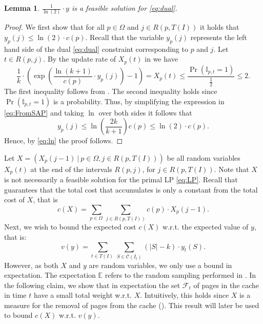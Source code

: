 \documentclass[11pt]{article}
\newcommand{\op}{{\mathbb{I}_{p,t}}}
\newcommand{\cF}{{\mathcal{F}}}
\newcommand{\cC}{{\mathcal{C}}}
\newcommand{\E}{{\mathbb{E}}}
\newcommand{\om}{{\Omega}}
\newcommand{\bbc}{{\bar{\cC}(I_t)}}
\newtheorem{lemma}[thm]{Lemma}
\begin{document}
{	\begin{lemma}
	\label{lem:dualF}
$\frac{1}{\ln(2)} \cdot y$ is a feasible solution for \eqref{eq:dual}. 
\end{lemma}

\begin{proof}
We first show that for all  $p \in \om$ and $j \in R(p,T(I))$ it holds that $y_p(j) \leq \ln (2) \cdot c(p)$. Recall that the variable $y_p(j)$ represents the left hand side of the dual \eqref{eq:dual} constraint corresponding to $p$ and $j$. Let $t \in R(p,j)$. By the update rate of $X_p(t)$ in  we have
	\begin{equation}
		\label{eq:FromSAP}
		  \frac{1}{k} \cdot \left(     \exp \left(  \frac{\ln (k+1)}{c(p)} \cdot y_p(j)\right)-1\right) = X_p(t) \leq  \frac{\Pr \left(   \op = 1 \right)}{\frac{1}{2}} \leq 2. 
	\end{equation} 	The first inequality follows from . The second inequality holds since $\Pr \left(   \op = 1 \right)$ is a probability. Thus, by simplifying the expression in \eqref{eq:FromSAP} and taking $\ln$ over both sides it follows that 
	\begin{equation}
		\label{eq:ln}
		y_p(j) \leq \ln \left( \frac{2k}{k+1} \right) c(p) \leq \ln (2) \cdot c(p).  
	\end{equation}  Hence, by \eqref{eq:ln} the proof follows. 
\end{proof}


Let $X = \left( X_p(j-1)~|~p \in \om, j \in R(p,T(I))\right)$ be all random variables $X_p(t)$ at the end of the intervals $R(p,j)$, for $j \in R(p,T(I))$. Note that $X$ is not necessarily a feasible solution for the primal LP \eqref{eq:LP}. Recall that  guarantees that the total cost that  accumulates is only a constant from the total cost of $X$, that is $$c(X) = \sum_{p \in \om~} \sum_{j \in R(p,T(I))} c(p) \cdot X_p(j-1).$$
Next, we wish to bound the expected cost $c(X)$ w.r.t. the expected value of $y$, that is:
$$v(y) = \sum_{t \in T(I)~} \sum_{S \in \bbc} \left( |S|-k \right) \cdot y_t(S).$$
However, as both $X$ and $y$ are random variables, we only use a bound in expectation. The expectation $\E$ refers to the random sampling performed in . In the following claim, we show that in expectation the set $\cF_t$ of pages in the cache in time $t$ have a small total weight w.r.t. $X$. Intuitively, this holds since $X$ is a measure for the removal of pages from the cache (). This result will later be used to bound $c(X)$ w.r.t. $v(y)$. 

}
\end{document}
